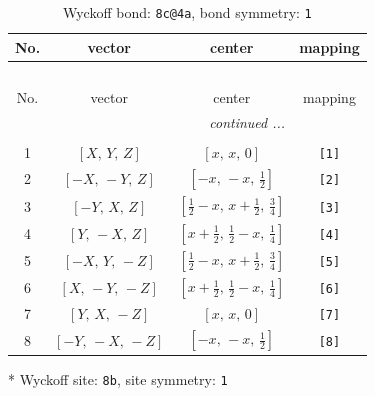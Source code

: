 \documentclass[fleqn,8pt]{jsarticle}
\begin{document}
\begin{longtable}{cccc}
\caption{Wyckoff bond: {\tt 8c@4a}, bond symmetry: {\tt 1}}
 \\
 \hline \hline
No. & vector & center & mapping \\ \hline \endfirsthead

\multicolumn{3}{l}{\tablename\ \thetable{}} \\
 \hline \hline
No. & vector & center & mapping \\ \hline \endhead

 \hline \hline
\multicolumn{3}{r}{\footnotesize\it continued ...} \\ \endfoot

 \hline \hline
\multicolumn{3}{r}{} \\ \endlastfoot

1 & $\left[ X,\, Y,\, Z \right]$ & $\left[ x,\, x,\, 0 \right]$ & {\tt [1]} \\ \hline
2 & $\left[ - X,\, - Y,\, Z \right]$ & $\left[ - x,\, - x,\, \frac{1}{2} \right]$ & {\tt [2]} \\ \hline
3 & $\left[ - Y,\, X,\, Z \right]$ & $\left[ \frac{1}{2} - x,\, x + \frac{1}{2},\, \frac{3}{4} \right]$ & {\tt [3]} \\ \hline
4 & $\left[ Y,\, - X,\, Z \right]$ & $\left[ x + \frac{1}{2},\, \frac{1}{2} - x,\, \frac{1}{4} \right]$ & {\tt [4]} \\ \hline
5 & $\left[ - X,\, Y,\, - Z \right]$ & $\left[ \frac{1}{2} - x,\, x + \frac{1}{2},\, \frac{3}{4} \right]$ & {\tt [5]} \\ \hline
6 & $\left[ X,\, - Y,\, - Z \right]$ & $\left[ x + \frac{1}{2},\, \frac{1}{2} - x,\, \frac{1}{4} \right]$ & {\tt [6]} \\ \hline
7 & $\left[ Y,\, X,\, - Z \right]$ & $\left[ x,\, x,\, 0 \right]$ & {\tt [7]} \\ \hline
8 & $\left[ - Y,\, - X,\, - Z \right]$ & $\left[ - x,\, - x,\, \frac{1}{2} \right]$ & {\tt [8]} \\
\end{longtable}
* Wyckoff site: {\tt 8b}, site symmetry: {\tt 1}
\renewcommand{\arraystretch}{1.2}
\end{document}
